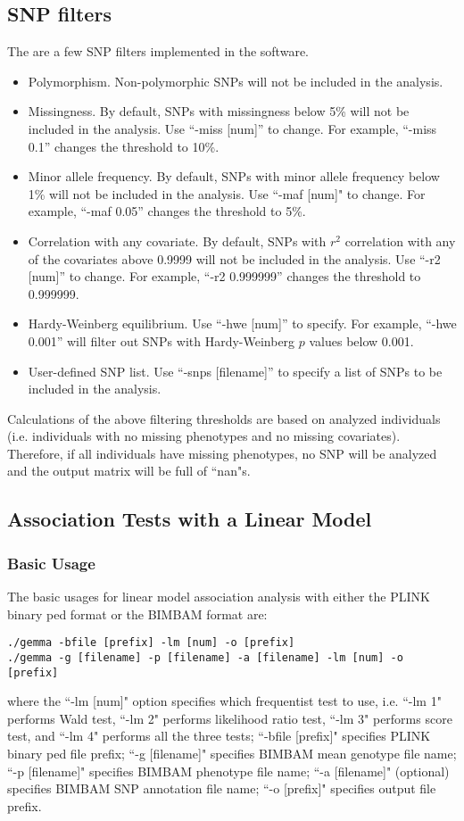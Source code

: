 \documentclass[11pt]{article}
\begin{document}
\subsection{SNP filters}
The are a few SNP filters implemented in the software.
\begin{itemize}
\item Polymorphism. Non-polymorphic SNPs will not be included in the analysis.
\item Missingness. By default, SNPs with missingness below 5\% will not be included in the analysis. Use ``-miss [num]'' to change. For example, ``-miss 0.1'' changes the threshold to 10\%.
\item Minor allele frequency. By default, SNPs with minor allele frequency below 1\% will not be included in the analysis. Use ``-maf [num]" to change. For example, ``-maf 0.05'' changes the threshold to 5\%.
\item Correlation with any covariate. By default, SNPs with $r^2$ correlation with any of the covariates above 0.9999 will not be included in the analysis. Use ``-r2 [num]'' to change. For example, ``-r2 0.999999'' changes the threshold to 0.999999.
\item Hardy-Weinberg equilibrium. Use ``-hwe [num]'' to specify. For example, ``-hwe 0.001'' will filter out SNPs with Hardy-Weinberg $p$ values below 0.001.
\item User-defined SNP list. Use ``-snps [filename]'' to specify a list of SNPs to be included in the analysis. 
\end{itemize}

Calculations of the above filtering thresholds are based on analyzed individuals (i.e. individuals with no missing phenotypes and no missing covariates). Therefore, if all individuals have missing phenotypes, no SNP will be analyzed and the output matrix will be full of ``nan"s. 





\subsection{Association Tests with a Linear Model}
\subsubsection{Basic Usage}
The basic usages for linear model association analysis with either the PLINK binary ped format or the BIMBAM format are:
\begin{verbatim}
./gemma -bfile [prefix] -lm [num] -o [prefix]
./gemma -g [filename] -p [filename] -a [filename] -lm [num] -o [prefix]
\end{verbatim}
where the ``-lm [num]" option specifies which frequentist test to use, i.e. ``-lm 1" performs Wald test, ``-lm 2" performs likelihood ratio test, ``-lm 3" performs score test, and ``-lm 4" performs all the three tests; ``-bfile [prefix]" specifies PLINK binary ped file prefix; ``-g [filename]" specifies BIMBAM mean genotype file name; ``-p [filename]" specifies BIMBAM phenotype file name; ``-a [filename]" (optional) specifies BIMBAM SNP annotation file name; ``-o [prefix]" specifies output file prefix. 
\end{document}
